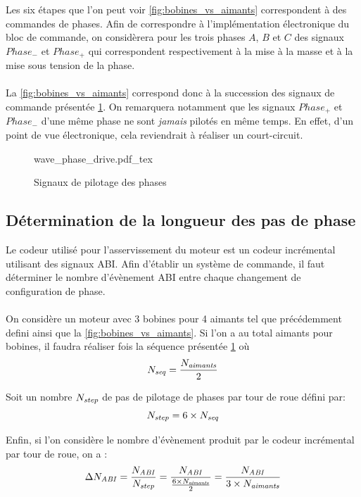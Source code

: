 Les six étapes que l'on peut voir \cref{fig:bobines_vs_aimants} correspondent à des commandes de phases.
Afin de correspondre à l'implémentation électronique du bloc de commande, on considèrera pour les trois phases $A$, $B$ et $C$ des signaux $\mathit{Phase}_-$ et $\mathit{Phase}_+$
qui correspondent respectivement à la mise à la masse et à la mise sous tension de la phase.

\paragraph{}
La \cref{fig:bobines_vs_aimants} correspond donc à la succession des signaux de commande présentée \cref{fig:wave_phase_drive}. 
On remarquera notamment que les signaux $\mathit{Phase}_+$ et $\mathit{Phase}_-$ d'une même phase ne sont \emph{jamais} pilotés en même temps.
En effet, d'un point de vue électronique, cela reviendrait à réaliser un court-circuit. 

\begin{figure}[h]
    \centering
    {wave_phase_drive.pdf_tex}
    \caption{Signaux de pilotage des phases}
    \label{fig:wave_phase_drive}
\end{figure}

\subsection{Détermination de la longueur des pas de phase}
Le codeur utilisé pour l'asservissement du moteur est un codeur incrémental utilisant des signaux ABI.
Afin d'établir un système de commande, il faut déterminer \dnabi le nombre d'évènement ABI entre chaque changement de configuration de phase.

\paragraph{}
On considère un moteur avec 3 bobines pour 4 aimants tel que précédemment defini ainsi que la \cref{fig:bobines_vs_aimants}.
Si l'on a au total \naimants aimants pour \nbobines bobines, il faudra réaliser \nseq fois la séquence présentée \cref{fig:wave_phase_drive} où
$$N_\mathit{seq} = \frac{N_\mathit{aimants}}{2}$$

Soit un nombre $N_\mathit{step}$ de pas de pilotage de phases par tour de roue défini par:
$$N_\mathit{step} = 6 \times N_\mathit{seq}$$

Enfin, si l'on considère \nabi le nombre d'évènement produit par le codeur incrémental par tour de roue, on a :
$$\Delta N_\mathit{ABI} = \frac{N_\mathit{ABI}}{N_\mathit{step}} = \frac{N_\mathit{ABI}}{\frac{6\times N_\mathit{aimants}}{2}} = \frac{N_\mathit{ABI}}{3\times N_\mathit{aimants}}$$

